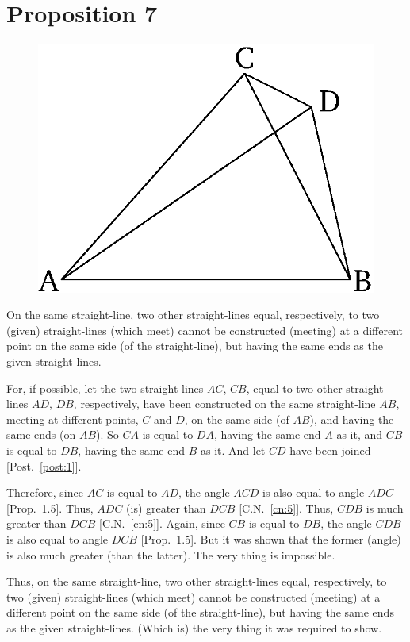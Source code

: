 \chapter*{Proposition 7}
\label{prop:7}

\begin{figure}[ht]
    \begin{center}
    \includegraphics[width=0.5\linewidth]{figures/fig07e.eps}
    \label{fig:prop_7}
    \end{center}
\end{figure}

On the same straight-line, two other straight-lines 
equal, respectively, to 
two (given) straight-lines (which meet) cannot be constructed (meeting)
at  a different point on the same
side (of the straight-line), but having the same ends as the given straight-lines.

For, if possible, let the two straight-lines $AC$, $CB$, equal to two other straight-lines $AD$, $DB$, respectively, have been constructed
on the same straight-line $AB$, meeting at different points, $C$ and $D$, on the
same side (of $AB$), and having the same ends (on $AB$). So $CA$ is equal to $DA$, having the same end $A$ as it, and $CB$ is equal to $DB$, having the
same end $B$ as it. And let $CD$ have been joined [Post.~\ref{post:1}].

Therefore, since $AC$ is equal to $AD$,  the angle $ACD$ is also equal to angle $ADC$ [Prop.~1.5].
Thus, $ADC$ (is) greater than $DCB$ [C.N.~\ref{cn:5}]. Thus, $CDB$ is much greater
than $DCB$ [C.N.~\ref{cn:5}]. Again, since  $CB$ is equal to $DB$, the angle $CDB$ is also equal to
angle $DCB$ [Prop.~1.5]. But it was shown that the former (angle) is also much
greater (than the latter). The very thing is impossible.

Thus, on the same straight-line, two other straight-lines equal, respectively, to  
two (given) straight-lines  (which meet) cannot be constructed (meeting)
at a different point on the same
side (of the straight-line), but having the same ends as the given straight-lines.
(Which is) the very thing it was required to show.


